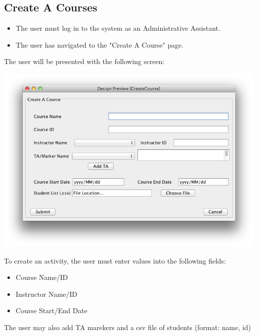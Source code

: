 \documentclass{article}
\begin{document}
\subsection{Create A Courses}
\begin{itemize}
	\item The user must log in to the system as an Administrative Assistant.
	\item The user has navigated to the "Create A Course" page.
\end{itemize}
The user will be presented with the following screen:
\begin{center} 
   	\includegraphics[scale=0.55]{../images/UpdatedUIScreens/CreateCourse.png}
\end{center} 
To create an activity, the user must enter values into the following fields:
\begin{itemize}
	\item Course Name/ID
	\item Instructor Name/ID
	\item Course Start/End Date
\end{itemize}
The user may also add TA marekers and a csv file of students (format: name, id)\\
\clearpage
\end{document}
